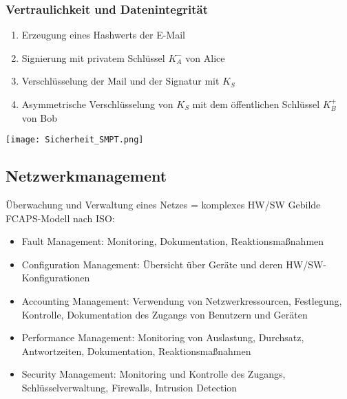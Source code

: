 		\subsubsection{Vertraulichkeit und Datenintegrität}
			\begin{enumerate}
				\item Erzeugung eines Hashwerts der E-Mail
				\item Signierung mit privatem Schlüssel $K_A^-$ von Alice
				\item Verschlüsselung der Mail und der Signatur mit $K_S$
				\item Asymmetrische Verschlüsselung von $K_S$ mit dem öffentlichen Schlüssel $K_B^+$ von Bob
			\end{enumerate}
			\begin{center}
				\texttt{[image: Sicherheit\_SMPT.png]}
			\end{center}

	
	\subsection{Netzwerkmanagement}
		Überwachung und Verwaltung eines Netzes = komplexes HW/SW Gebilde \newline
		FCAPS-Modell nach ISO:
		\begin{itemize}
			\item Fault Management: Monitoring, Dokumentation, Reaktionsmaßnahmen
			\item Configuration Management: Übersicht über Geräte und deren HW/SW-Konfigurationen 
			\item Accounting Management: Verwendung von Netzwerkressourcen, Festlegung, Kontrolle, Dokumentation des Zugangs von Benutzern und Geräten
			\item Performance Management: Monitoring von Auslastung, Durchsatz, Antwortzeiten, Dokumentation, Reaktionsmaßnahmen
			\item Security Management: Monitoring und Kontrolle des Zugangs, Schlüsselverwaltung, Firewalls, Intrusion Detection
		\end{itemize}
